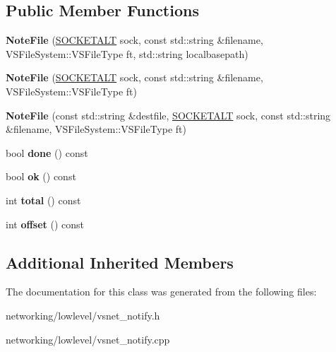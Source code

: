 \subsection*{Public Member Functions}
\begin{DoxyCompactItemize}
\item 
{\bfseries Note\+File} (\hyperlink{classSOCKETALT}{S\+O\+C\+K\+E\+T\+A\+LT} sock, const std\+::string \&filename, V\+S\+File\+System\+::\+V\+S\+File\+Type ft, std\+::string localbasepath)\hypertarget{classVsnetDownload_1_1Client_1_1NoteFile_aed57fcbfedaca680e6b05d5a92175a4b}{}\label{classVsnetDownload_1_1Client_1_1NoteFile_aed57fcbfedaca680e6b05d5a92175a4b}

\item 
{\bfseries Note\+File} (\hyperlink{classSOCKETALT}{S\+O\+C\+K\+E\+T\+A\+LT} sock, const std\+::string \&filename, V\+S\+File\+System\+::\+V\+S\+File\+Type ft)\hypertarget{classVsnetDownload_1_1Client_1_1NoteFile_a7248e14d5734e1fe843a3349a4df85fe}{}\label{classVsnetDownload_1_1Client_1_1NoteFile_a7248e14d5734e1fe843a3349a4df85fe}

\item 
{\bfseries Note\+File} (const std\+::string \&destfile, \hyperlink{classSOCKETALT}{S\+O\+C\+K\+E\+T\+A\+LT} sock, const std\+::string \&filename, V\+S\+File\+System\+::\+V\+S\+File\+Type ft)\hypertarget{classVsnetDownload_1_1Client_1_1NoteFile_a68de712b6c41769532f5827060933f89}{}\label{classVsnetDownload_1_1Client_1_1NoteFile_a68de712b6c41769532f5827060933f89}

\item 
bool {\bfseries done} () const \hypertarget{classVsnetDownload_1_1Client_1_1NoteFile_a505d9e22d9929f6f6dcbb58c4b34a246}{}\label{classVsnetDownload_1_1Client_1_1NoteFile_a505d9e22d9929f6f6dcbb58c4b34a246}

\item 
bool {\bfseries ok} () const \hypertarget{classVsnetDownload_1_1Client_1_1NoteFile_abe28233bb76a2d9c7ef4096152fa5f14}{}\label{classVsnetDownload_1_1Client_1_1NoteFile_abe28233bb76a2d9c7ef4096152fa5f14}

\item 
int {\bfseries total} () const \hypertarget{classVsnetDownload_1_1Client_1_1NoteFile_af3aeba865e1ee427c6a95f7acb6c695a}{}\label{classVsnetDownload_1_1Client_1_1NoteFile_af3aeba865e1ee427c6a95f7acb6c695a}

\item 
int {\bfseries offset} () const \hypertarget{classVsnetDownload_1_1Client_1_1NoteFile_afffbe793874a022cee0b37e89e5d92c5}{}\label{classVsnetDownload_1_1Client_1_1NoteFile_afffbe793874a022cee0b37e89e5d92c5}

\end{DoxyCompactItemize}
\subsection*{Additional Inherited Members}


The documentation for this class was generated from the following files\+:\begin{DoxyCompactItemize}
\item 
networking/lowlevel/vsnet\+\_\+notify.\+h\item 
networking/lowlevel/vsnet\+\_\+notify.\+cpp\end{DoxyCompactItemize}
